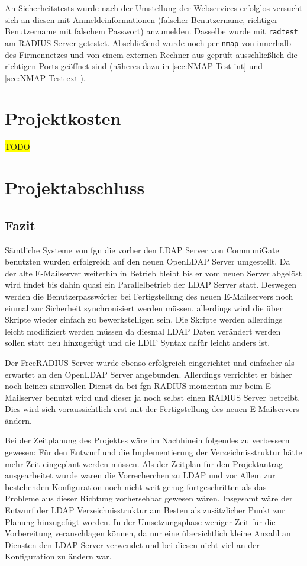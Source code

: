 \documentclass[11pt,a4paper,titlepage=firstiscover,headsepline]{scrartcl} %
\newcommand{\hilight}[1]{\colorbox{yellow}{#1}} %
\begin{document}
\medskip \noindent
An Sicherheitstests wurde nach der Umstellung der Webservices erfolglos versucht sich an diesen mit Anmeldeinformationen (falscher Benutzername, richtiger Benutzername mit falschem Passwort) anzumelden. Dasselbe wurde mit \texttt{radtest} am RADIUS Server getestet.
Abschließend wurde noch per \texttt{nmap} von innerhalb des Firmennetzes und von einem externen Rechner aus geprüft ausschließlich die richtigen Ports geöffnet sind (näheres dazu in \autoref{sec:NMAP-Test-int} und \autoref{sec:NMAP-Test-ext}).

\section{Projektkosten}
\hilight{TODO}

\section{Projektabschluss}
\subsection{Fazit}
Sämtliche Systeme von fgn die vorher den LDAP Server von CommuniGate benutzten wurden erfolgreich auf den neuen OpenLDAP Server umgestellt. Da der alte E-Mailserver weiterhin in Betrieb bleibt bis er vom neuen Server abgelöst wird findet bis dahin quasi ein Parallelbetrieb der LDAP Server statt. Deswegen werden die Benutzerpasswörter bei Fertigstellung des neuen E-Mailservers noch einmal zur Sicherheit synchronisiert werden müssen, allerdings wird die über Skripte wieder einfach zu bewerkstelligen sein. Die Skripte werden allerdings leicht modifiziert werden müssen da diesmal LDAP Daten verändert werden sollen statt neu hinzugefügt und die LDIF Syntax dafür leicht anders ist.

Der FreeRADIUS Server wurde ebenso erfolgreich eingerichtet und einfacher als erwartet an den OpenLDAP Server angebunden. Allerdings verrichtet er bisher noch keinen sinnvollen Dienst da bei fgn RADIUS momentan nur beim E-Mailserver benutzt wird und dieser ja noch selbst einen RADIUS Server betreibt. Dies wird sich voraussichtlich erst mit der Fertigstellung des neuen E-Mailservers ändern.

Bei der Zeitplanung des Projektes wäre im Nachhinein folgendes zu verbessern gewesen: Für den Entwurf und die Implementierung der Verzeichnisstruktur hätte mehr Zeit eingeplant werden müssen. Als der Zeitplan für den Projektantrag ausgearbeitet wurde waren die Vorrecherchen zu LDAP und vor Allem zur bestehenden Konfiguration noch nicht weit genug fortgeschritten als das Probleme aus dieser Richtung vorhersehbar gewesen wären. Insgesamt wäre der Entwurf der LDAP Verzeichnisstruktur am Besten als zusätzlicher Punkt zur Planung hinzugefügt worden. In der Umsetzungsphase weniger Zeit für die Vorbereitung veranschlagen können, da nur eine übersichtlich kleine Anzahl an Diensten den LDAP Server verwendet und bei diesen nicht viel an der Konfiguration zu ändern war.
\end{document}
